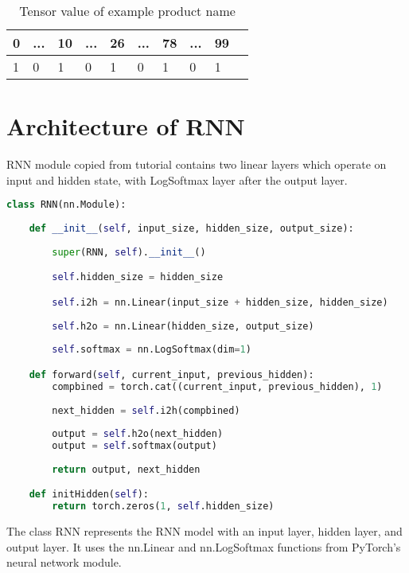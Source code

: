 \begin{table}[htp!]
    \centering
    \caption{Tensor value of example product name}
    \label{table:tensorvalue}
    \begin{tabular}{ llllllllll }
          \toprule
          
          \textbf{0} & \textbf{...}& \textbf{10}&\textbf{...}&\textbf{26}&\textbf{...}&\textbf{78}&\textbf{...}&\textbf{99}\\
          \midrule
          1 & 0& 1& 0&1& 0& 1 & 0& 1\\
                 
        
          \bottomrule
          \end{tabular}
\end{table}

\section{Architecture of \acf{RNN}}
\acs{RNN} module copied from \parencite{sean} tutorial contains two linear layers which operate on input and hidden state, with LogSoftmax layer after the output layer. 
\begin{lstlisting}[language=Python,label=code:RNN-class, caption={\acf{RNN} class}]
class RNN(nn.Module):
        
    def __init__(self, input_size, hidden_size, output_size):
        
        super(RNN, self).__init__()

        self.hidden_size = hidden_size

        self.i2h = nn.Linear(input_size + hidden_size, hidden_size)
        
        self.h2o = nn.Linear(hidden_size, output_size)
        
        self.softmax = nn.LogSoftmax(dim=1)

    def forward(self, current_input, previous_hidden):
        compbined = torch.cat((current_input, previous_hidden), 1)
        
        next_hidden = self.i2h(compbined)
        
        output = self.h2o(next_hidden)
        output = self.softmax(output)
        
        return output, next_hidden

    def initHidden(self):
        return torch.zeros(1, self.hidden_size)
\end{lstlisting}

The class RNN represents the RNN model with an input layer, hidden layer, and output layer. It uses the nn.Linear and nn.LogSoftmax functions from PyTorch's neural network module.

